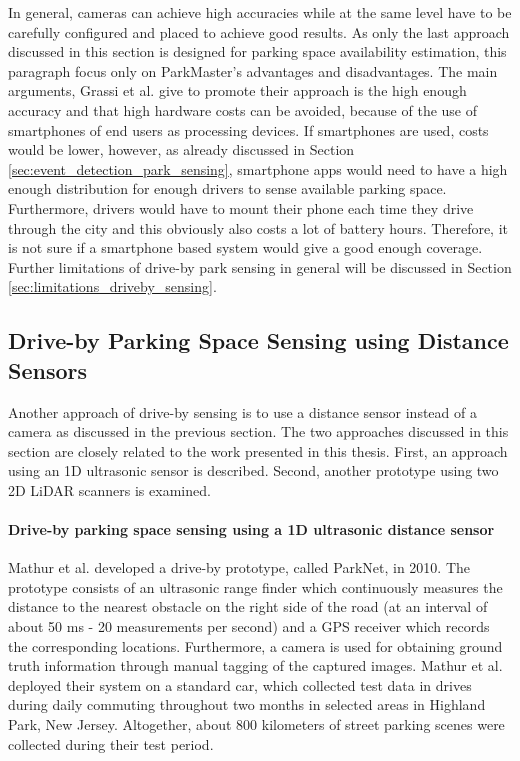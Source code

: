 In general, cameras can achieve high accuracies while at the same level have to be carefully configured and placed to achieve good results.
As only the last approach discussed in this section is designed for parking space availability estimation, this paragraph focus only on ParkMaster's advantages and disadvantages. The main arguments, Grassi et al. give to promote their approach is the high enough accuracy and that high hardware costs can be avoided, because of the use of smartphones of end users as processing devices. If smartphones are used, costs would be lower, however, as already discussed in Section \ref{sec:event_detection_park_sensing}, smartphone apps would need to have a high enough distribution for enough drivers to sense available parking space. Furthermore, drivers would have to mount their phone each time they drive through the city and this obviously also costs a lot of battery hours. Therefore, it is not sure if a smartphone based system would give a good enough coverage. Further limitations of drive-by park sensing in general will be discussed in Section \ref{sec:limitations_driveby_sensing}.





\subsection{Drive-by Parking Space Sensing using Distance Sensors}
\label{sec:related_driveby_park_sensing_distance}

Another approach of drive-by sensing is to use a distance sensor instead of a camera as discussed in the previous section. The two approaches discussed in this section are closely related to the work presented in this thesis. First, an approach using an 1D ultrasonic sensor is described. Second, another prototype using two 2D LiDAR scanners is examined.

\paragraph{Drive-by parking space sensing using a 1D ultrasonic distance sensor}

Mathur et al. \cite{Mathur:2010:PDS:1814433.1814448} developed a drive-by prototype, called ParkNet, in 2010. The prototype consists of an ultrasonic range finder which continuously measures the distance to the nearest obstacle on the right side of the road (at an interval of about 50 ms - 20 measurements per second) and a GPS receiver which records the corresponding locations. Furthermore, a camera is used for obtaining ground truth information through manual tagging of the captured images. Mathur et al. deployed their system on a standard car, which collected test data in drives during daily commuting throughout two months in selected areas in Highland Park, New Jersey. Altogether, about 800 kilometers of street parking scenes were collected during their test period.

